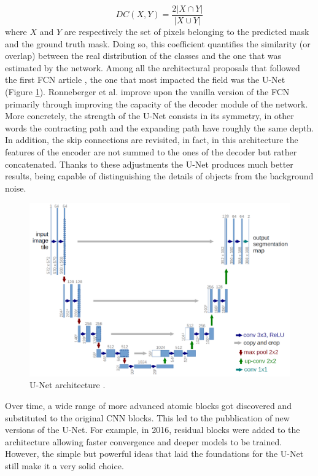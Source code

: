 \begin{equation}
DC(X,Y) = \frac{2|X\cap Y|}{|X\cup Y|}
\end{equation}
where $X$ and $Y$ are respectively the set of pixels belonging to the predicted mask and the ground truth mask. Doing so, this coefficient quantifies the similarity (or overlap) between the real distribution of the classes and the one that was estimated by the network.
\bigbreak
\noindent Among all the architectural proposals that followed the first FCN article \cite{long2015fully}, the one that most impacted the field was the U-Net \cite{ronneberger2015u} (Figure \ref{fig:unet}). Ronneberger et al. improve upon the vanilla version of the FCN primarily through improving the capacity of the decoder module of the network. More concretely, the strength of the U-Net consists in its symmetry, in other words the contracting path and the expanding path have roughly the same depth. In addition, the skip connections are revisited, in fact, in this architecture the features of the encoder are not summed to the ones of the decoder but rather concatenated. Thanks to these adjustments the U-Net produces much better results, being capable of distinguishing the details of objects from the background noise.
\bigbreak
\begin{figure}[t]
    \centering
    \captionsetup{justification=centering}
    \includegraphics[width=\textwidth]{./pictures/u-net}
    \caption{U-Net architecture \cite{ronneberger2015u}.}
    \label{fig:unet}
\end{figure}
\noindent Over time, a wide range of more advanced atomic blocks got discovered and substituted to the original CNN blocks. This led to the pubblication of new versions of the U-Net. For example, in 2016, residual blocks \cite{he2016deep} were added to the architecture \cite{drozdzal2016importance} allowing faster convergence and deeper models to be trained. However, the simple but powerful ideas that laid the foundations for the U-Net still make it a very solid choice.


